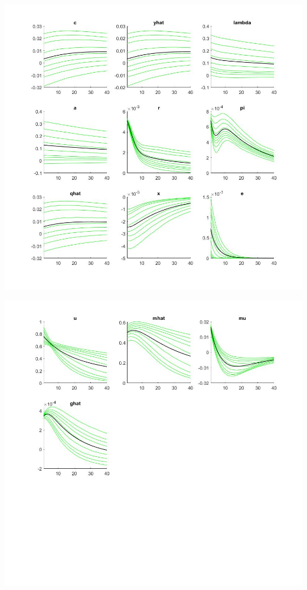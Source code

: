 \documentclass[11pt,preprint, authoryear]{elsarticle}
\let\origfigure\figure
\let\endorigfigure\endfigure
\renewenvironment{figure}[1][2] {
    \expandafter\origfigure\expandafter[H]
} {
    \endorigfigure
}
\numberwithin{equation}{section}
\numberwithin{figure}{section}
\numberwithin{table}{section}
\begin{document}
\begin{figure}
    \centering 
    \begin{minipage}[t]{8.2cm} 
        \centering 
        \includegraphics[width=\linewidth]{tay_fore_mean.jpg} 
    \end{minipage} 
    \hspace{0.1cm} 
    \begin{minipage}[t]{8.2cm} 
        \centering 
        \includegraphics[width=\linewidth]{tay_fore_mean1.jpg} 
    \end{minipage}
    \caption{Forecasted Variables (mean) - Taylor Rule}
    \label{tay_mean}
\end{figure}
\end{document}
